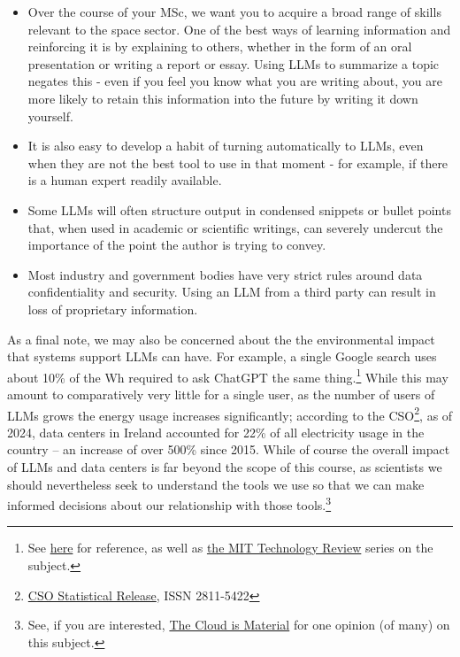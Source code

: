 \documentclass{tufte-book}
\begin{document}
\begin{itemize}
    \item  Over the course of your MSc, we want you to acquire a broad range of skills relevant to the space sector. One of the best ways of learning information and reinforcing it is by explaining to others, whether in the form of an oral presentation or writing a report or essay. Using LLMs to summarize a topic negates this - even if you feel you know what you are writing about, you are more likely to retain this information into the future by writing it down yourself.
    \item It is also easy to develop a habit of turning automatically to LLMs, even when they are not the best tool to use in that moment - for example, if there is a human expert readily available.
    \item Some LLMs will often structure output in condensed snippets or bullet points that, when used in academic or scientific writings, can severely undercut the importance of the point the author is trying to convey.
    \item Most industry and government bodies have very strict rules around data confidentiality and security. Using an LLM from a third party can result in loss of proprietary information. 
\end{itemize}

As a final note, we may also be concerned about the the environmental impact that systems support LLMs can have. For example, a single Google search uses about 10\% of the Wh required to ask ChatGPT the same thing.\footnote{See \href{https://www.rwdigital.ca/blog/how-much-energy-do-google-search-and-chatgpt-use/}{here} for reference, as well as \href{https://www.rwdigital.ca/blog/how-much-energy-do-google-search-and-chatgpt-use/}{the MIT Technology Review} series on the subject.} While this may amount to comparatively very little for a single user, as the number of users of LLMs grows the energy usage increases significantly; according to the CSO\footnote{\href{https://www.cso.ie/en/releasesandpublications/ep/p-dcmec/datacentresmeteredelectricityconsumption2024/}{CSO Statistical Release}, ISSN 2811-5422}, as of 2024, data centers in Ireland accounted for 22\% of all electricity usage in the country -- an increase of over 500\% since 2015. While of course the overall impact of LLMs and data centers is far beyond the scope of this course, as scientists we should nevertheless seek to understand the tools we use so that we can make informed decisions about our relationship with those tools.\footnote{See, if you are interested, \href{https://mit-serc.pubpub.org/pub/the-cloud-is-material/release/2}{The Cloud is Material} for one opinion (of many) on this subject.}
\end{document}

